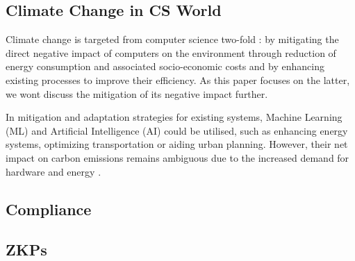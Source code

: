 

\subsection{Climate Change in CS World}
Climate change is targeted from computer science two-fold \cite{cs_cc}: by mitigating the direct negative impact of computers on the environment through reduction of energy consumption and associated socio-economic costs and by enhancing existing processes to improve their efficiency. As this paper focuses on the latter, we wont discuss the mitigation of its negative impact further. 

In mitigation and adaptation strategies for existing systems, Machine Learning (ML) \cite{MachineLearning} and Artificial Intelligence (AI) \cite{AI_CC} could be utilised, such as enhancing energy systems, optimizing transportation or aiding urban planning. However, their net impact on carbon emissions remains ambiguous due to the increased demand for hardware and energy \cite{AI_CC_2}. 




\subsection{Compliance}

\subsection{ZKPs}